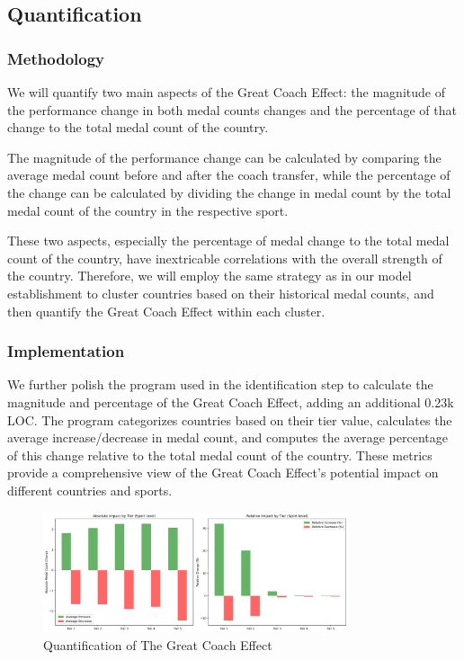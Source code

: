 \documentclass{mcmthesis}
\begin{document}
\subsection{Quantification}

\subsubsection{Methodology}

We will quantify two main aspects of the Great Coach Effect: the magnitude of the performance change in both medal counts changes and the percentage of that change to the total medal count of the country.

The magnitude of the performance change can be calculated by comparing the average medal count before and after the coach transfer, while the percentage of the change can be calculated by dividing the change in medal count by the total medal count of the country in the respective sport.

These two aspects, especially the percentage of medal change to the total medal count of the country, have inextricable correlations with the overall strength of the country. Therefore, we will employ the same strategy as in our model establishment to cluster countries based on their historical medal counts, and then quantify the Great Coach Effect within each cluster.


\subsubsection{Implementation}

We further polish the program used in the identification step to calculate the magnitude and percentage of the Great Coach Effect, adding an additional 0.23k LOC. The program categorizes countries based on their tier value, calculates the average increase/decrease in medal count, and computes the average percentage of this change relative to the total medal count of the country. These metrics provide a comprehensive view of the Great Coach Effect's potential impact on different countries and sports.

\begin{figure}[htbp]
    \centering
    \includegraphics[width=0.8\textwidth]{pics/coach_effect_impact_Sport_from_csv.png}
    \caption{Quantification of The Great Coach Effect}
\end{figure}
\end{document}
